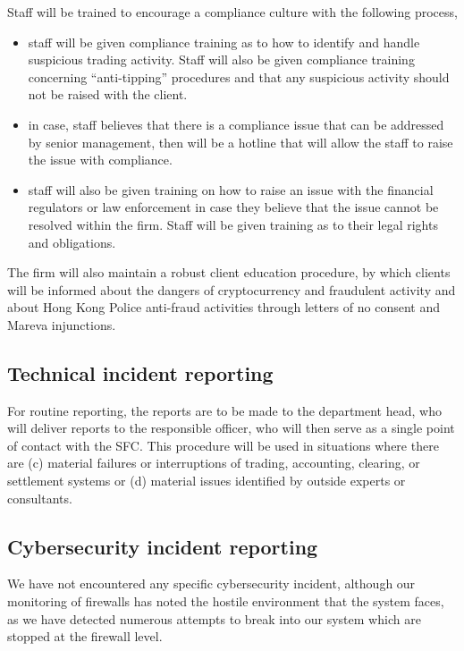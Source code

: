 Staff will be trained to encourage a compliance culture with the
following process,
\begin{itemize}
  \item staff will be given compliance training as to how to identify
    and handle suspicious trading activity.  Staff will also be given
    compliance training concerning ``anti-tipping'' procedures and
    that any suspicious activity should not be raised with the client.
  \item in case, staff believes that there is a compliance issue that
    can be addressed by senior management, then will be a hotline that
    will allow the staff to raise the issue with compliance.
  \item staff will also be given training on how to raise an issue
    with the financial regulators or law enforcement in case they
    believe that the issue cannot be resolved within the firm.  Staff
    will be given training as to their legal rights and obligations.
\end{itemize}

The firm will also maintain a robust client education procedure, by
which clients will be informed about the dangers of cryptocurrency and
fraudulent activity and about Hong Kong Police anti-fraud activities
through letters of no consent and Mareva injunctions.

\subsection{Technical incident reporting}

For routine reporting, the reports are to be made to the department
head, who will deliver reports to the responsible officer, who will
then serve as a single point of contact with the SFC.  This procedure
will be used in situations where there are (c) material failures or
interruptions of trading, accounting, clearing, or settlement systems
or (d) material issues identified by outside experts or consultants.

\subsection{Cybersecurity incident reporting}

We have not encountered any specific cybersecurity incident, although
our monitoring of firewalls has noted the hostile environment that
the system faces, as we have detected numerous attempts to break into our
system which are stopped at the firewall level.

